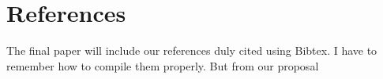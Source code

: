 \section{References}
  The final paper will include our references duly cited using Bibtex.
  I have to remember how to compile them properly.
  But from our proposal

  
